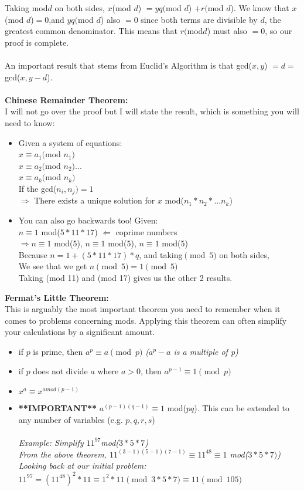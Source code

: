 \documentclass[a4paper]{article}
\begin{document}
Taking mod$d$ on both sides, $x$(mod $d$) $= yq($mod $d$) $+ r($mod $d$). We know that $x$(mod $d$)$= 0$,and $yq($mod $d$) also $= 0$ since both terms are divisible by $d$, the greatest common denominator. This means that $r($mod$d$) must also $= 0$, so our proof is complete.\\\\An important result that stems from Euclid's Algorithm is that gcd($x,y$) $= d =$ gcd($x,y-d$).\\\\
\textbf{Chinese Remainder Theorem:} \\
I will not go over the proof but I will state the result, which is something you will need to know:
\begin{itemize}
    \item Given a system of equations:\\
        $x \equiv a_1($mod $n_1)$\\$x \equiv a_2($mod $n_2)...$\\$x \equiv a_k($mod $n_k)$\\ If the gcd($n_i, n_j) = 1$\\ $\Rightarrow$ There exists a unique solution for $x$ mod($n_1 * n_2 * ... n_k$) 
    \item You can also go backwards too! Given:\\
    $n \equiv 1$ mod($5 * 11 * 17$) $\Leftarrow$ coprime numbers\\
    $\Rightarrow n\equiv 1$ mod($5$), $n\equiv 1$ mod($5$), $n\equiv 1$ mod($5$)\\
    Because $n = 1 + (5*11*17) * q$, and taking$\pmod 5$ on both sides,\\
    We see that we get $n\pmod5 = 1\pmod 5$\\
    Taking (mod 11) and (mod 17) gives us the other 2 results. 
\end{itemize}
\textbf{Fermat's Little Theorem:} \\
This is arguably the most important theorem you need to remember when it comes to problems concerning mods. Applying this theorem can often simplify your calculations by a significant amount. 
\begin{itemize}
	\item if $p$ is prime, then $a^p\equiv a\pmod p$ \textit{($a^p - a$ is a multiple of p)}
	\item if $p$ does not divide $a$ where $a >0$, then $a^{p - 1}\equiv 1\pmod p$
	\item $x^a \equiv x^{a mod(p-1)}$
	\item \textbf{**IMPORTANT**} $a^{(p-1)(q-1)}\equiv 1$ mod($pq$). This can be extended to any number of variables (e.g. $p,q,r, s$)\\\\
    \textit{Example: Simplify $11^{97}$mod($3 * 5*7$)\\ From the above theorem, $11^{(3-1)(5-1)(7-1)} \equiv 11^{48} \equiv 1$ mod($3*5*7)$)\\Looking back at our initial problem:\\ $11^{97} = (11^{48})^2 * 11 \equiv 1^2 * 11\pmod{3*5*7} \equiv 11\pmod{105}$ }
\end{itemize}
\end{document}

